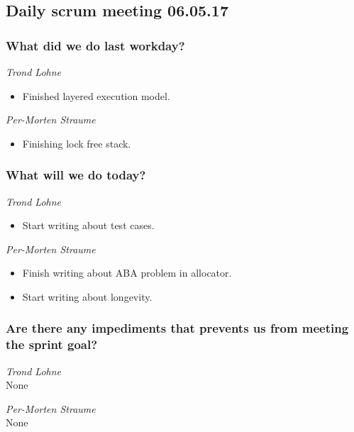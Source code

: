 \documentclass{article}
\begin{document}
\begin{center}
\subsection*{Daily scrum meeting 06.05.17}
\end{center}
\bigskip


\subsubsection*{What did we do last workday?}

\noindent\textit{Trond Lohne}
\begin{itemize}
	\item
	Finished layered execution model.
\end{itemize}

\medskip

\noindent\textit{Per-Morten Straume}
\begin{itemize}
	\item
	Finishing lock free stack.
\end{itemize}


\subsubsection*{What will we do today?}

\noindent\textit{Trond Lohne}
\begin{itemize}
	\item
	Start writing about test cases.
\end{itemize}

\medskip

\noindent\textit{Per-Morten Straume}
\begin{itemize}
	\item
	Finish writing about ABA problem in allocator.

	\item
	Start writing about longevity.
\end{itemize}


\subsubsection*{Are there any impediments that prevents us from meeting the sprint goal?}

\noindent\textit{Trond Lohne}\\
None

\medskip

\noindent\textit{Per-Morten Straume}\\
None
\end{document}
